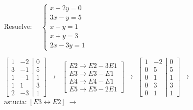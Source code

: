 \begin{ejre} 
Resuelve: $\quad \begin{cases}x-2y=0\\3x-y=5\\x-y=1\\x+y=3\\2x-3y=1\end{cases}$	
\end{ejre}
\begin{proofw}\renewcommand{\qedsymbol}{$\diamond$}

$\left[ \begin{matrix}
  1 & -2   \\ 3 & -1  \\ 1 & -1  \\ 1 & 1 \\ 2 & -3  
 \end{matrix}\right. 
 \left| \begin{matrix}
   0 \\ 5 \\ 1 \\ 3 \\ 1  
 \end{matrix}\right] \to \; $
 \textcolor{gris}{$\left[ \begin{matrix} E2 \to E2-3E1 \\ E3 \to E3-E1 \\ E4 \to E4-E1 \\ E5 \to E5-2E1   \end{matrix} \right] \to $} 
$\left[ \begin{matrix}
  1 & -2   \\ 0 & 5  \\ 0 & 1  \\ 0 & 3 \\ 0 & 1  
 \end{matrix}\right. 
 \left| \begin{matrix}
   0 \\ 5 \\ 1 \\ 3 \\ 1  
 \end{matrix}\right] \to \; $
 \textcolor{gris}{$  \text{astucia:} \; [E3 \leftrightarrow E2 ]\; \to $} 
 

\end{proofw}
